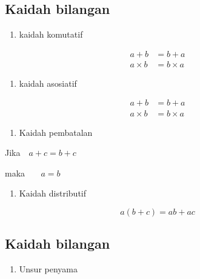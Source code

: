 \documentclass[
  letterpaper,
  DIV=11,
  numbers=noendperiod]{scrartcl}
\providecommand{\tightlist}{%
  \setlength{\itemsep}{0pt}\setlength{\parskip}{0pt}}\usepackage{longtable,booktabs,array}
\begin{document}
\hypertarget{kaidah-bilangan}{%
\subsection{Kaidah bilangan}\label{kaidah-bilangan}}

\begin{enumerate}
\def\labelenumi{\arabic{enumi}.}
\tightlist
\item
  kaidah komutatif
\end{enumerate}

\[
\begin{align}
a+b&=b+a \\
a \times b &= b \times a
\end{align}
\]

\begin{enumerate}
\def\labelenumi{\arabic{enumi}.}
\setcounter{enumi}{1}
\tightlist
\item
  kaidah asosiatif
\end{enumerate}

\[
\begin{align}
a+b&=b+a \\
a \times b &= b \times a 
\end{align}
\]

\begin{enumerate}
\def\labelenumi{\arabic{enumi}.}
\setcounter{enumi}{2}
\tightlist
\item
  Kaidah pembatalan
\end{enumerate}

Jika \(\ \ \ a+c = b+c\)

maka \(\ \ \ \ \ \ \ a = b\)

\begin{enumerate}
\def\labelenumi{\arabic{enumi}.}
\setcounter{enumi}{3}
\tightlist
\item
  Kaidah distributif
\end{enumerate}

\[
a(b+c)=ab+ac
\]

\hypertarget{kaidah-bilangan-1}{%
\subsection{Kaidah bilangan}\label{kaidah-bilangan-1}}

\begin{enumerate}
\def\labelenumi{\arabic{enumi}.}
\setcounter{enumi}{4}
\tightlist
\item
  Unsur penyama
\end{enumerate}
\end{document}

